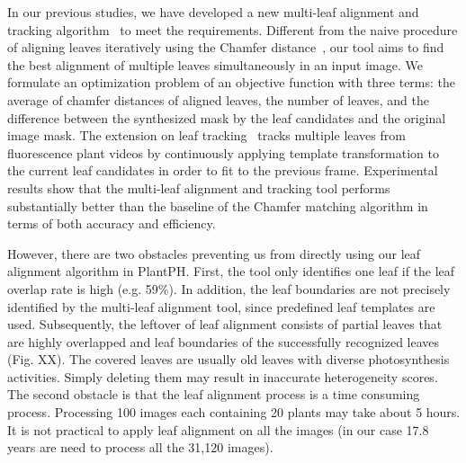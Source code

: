 \documentclass{bioinfo}
\begin{document}
In our previous studies, we have developed a new multi-leaf alignment and tracking algorithm~\citep{yin2014} to meet the requirements.  %
%
Different from the naive procedure of aligning leaves iteratively using the Chamfer distance~\citep{barrow1977parametric}, our tool aims to find the best alignment of multiple leaves simultaneously in an input image. We formulate an optimization problem of an objective function with three terms: the average of chamfer distances of aligned leaves, the number of leaves, and the difference between the synthesized mask by the leaf candidates and the original image mask.
%
The extension on leaf tracking~\citep{xi2014tracking} tracks multiple leaves from fluorescence plant videos by continuously applying template transformation to the current leaf candidates in order to fit to the previous frame.
%
Experimental results show that the multi-leaf alignment and tracking tool performs substantially better than the baseline of the Chamfer matching algorithm in terms of both accuracy and efficiency.






However, there are two obstacles preventing us from directly using our leaf alignment algorithm in PlantPH. First, the tool only identifies one leaf if the leaf overlap rate is high (e.g. 59\%).
%
In addition, the leaf boundaries are not precisely identified by the multi-leaf alignment tool, since predefined leaf templates are used.
%
Subsequently, the leftover of leaf alignment consists of partial leaves that are highly overlapped and leaf boundaries of the successfully recognized leaves (Fig. XX). The covered leaves are usually old leaves with diverse photosynthesis activities. Simply deleting them may result in inaccurate heterogeneity scores.
%
The second obstacle is that the leaf alignment process is a time consuming process. Processing 100 images each containing 20 plants may take about 5 hours. It is not practical to apply leaf alignment on all the images (in our case 17.8 years are need to process all the 31,120 images).
\end{document}
